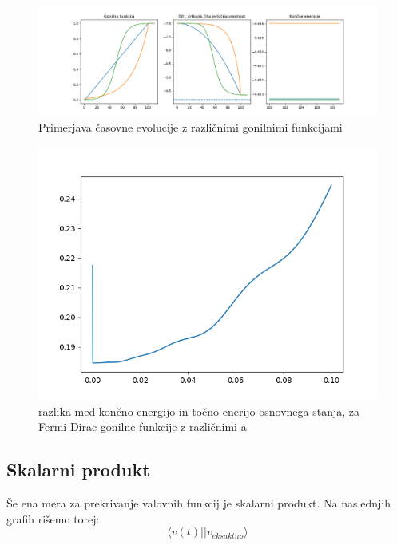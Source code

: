 \documentclass{article}
\begin{document}
\begin{figure}[H]
\includegraphics[width = \linewidth]{STFIM_Evolution.png}
\caption{Primerjava časovne evolucije z različnimi gonilnimi funkcijami}
\end{figure}

\begin{figure}[H]
    \centering
    \includegraphics[width = \linewidth]{FermiDira.png}
    \caption{razlika med končno energijo in točno enerijo osnovnega stanja, za Fermi-Dirac gonilne funkcije z različnimi a}
    \label{fig:enter-label}
\end{figure}

\subsection{Skalarni produkt}
Še ena mera za prekrivanje valovnih funkcij je skalarni produkt. Na naslednjih grafih rišemo torej:
\begin{equation}
    \langle v(t) \vert \vert v_{eksaktno} \rangle
\end{equation}
\end{document}
